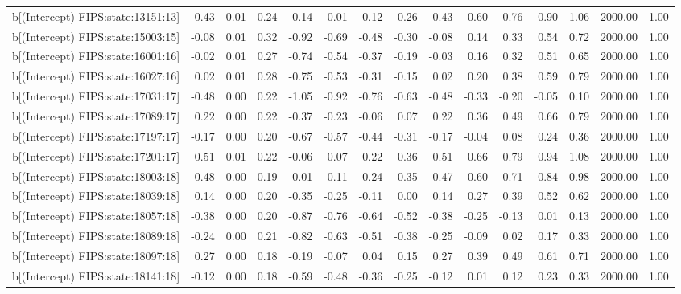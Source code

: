 \begin{table}[ht]
\begin{tabular}{rrrrrrrrrrrrrrr}
  b[(Intercept) FIPS:state:13151:13] & 0.43 & 0.01 & 0.24 & -0.14 & -0.01 & 0.12 & 0.26 & 0.43 & 0.60 & 0.76 & 0.90 & 1.06 & 2000.00 & 1.00 \\ 
  b[(Intercept) FIPS:state:15003:15] & -0.08 & 0.01 & 0.32 & -0.92 & -0.69 & -0.48 & -0.30 & -0.08 & 0.14 & 0.33 & 0.54 & 0.72 & 2000.00 & 1.00 \\ 
  b[(Intercept) FIPS:state:16001:16] & -0.02 & 0.01 & 0.27 & -0.74 & -0.54 & -0.37 & -0.19 & -0.03 & 0.16 & 0.32 & 0.51 & 0.65 & 2000.00 & 1.00 \\ 
  b[(Intercept) FIPS:state:16027:16] & 0.02 & 0.01 & 0.28 & -0.75 & -0.53 & -0.31 & -0.15 & 0.02 & 0.20 & 0.38 & 0.59 & 0.79 & 2000.00 & 1.00 \\ 
  b[(Intercept) FIPS:state:17031:17] & -0.48 & 0.00 & 0.22 & -1.05 & -0.92 & -0.76 & -0.63 & -0.48 & -0.33 & -0.20 & -0.05 & 0.10 & 2000.00 & 1.00 \\ 
  b[(Intercept) FIPS:state:17089:17] & 0.22 & 0.00 & 0.22 & -0.37 & -0.23 & -0.06 & 0.07 & 0.22 & 0.36 & 0.49 & 0.66 & 0.79 & 2000.00 & 1.00 \\ 
  b[(Intercept) FIPS:state:17197:17] & -0.17 & 0.00 & 0.20 & -0.67 & -0.57 & -0.44 & -0.31 & -0.17 & -0.04 & 0.08 & 0.24 & 0.36 & 2000.00 & 1.00 \\ 
  b[(Intercept) FIPS:state:17201:17] & 0.51 & 0.01 & 0.22 & -0.06 & 0.07 & 0.22 & 0.36 & 0.51 & 0.66 & 0.79 & 0.94 & 1.08 & 2000.00 & 1.00 \\ 
  b[(Intercept) FIPS:state:18003:18] & 0.48 & 0.00 & 0.19 & -0.01 & 0.11 & 0.24 & 0.35 & 0.47 & 0.60 & 0.71 & 0.84 & 0.98 & 2000.00 & 1.00 \\ 
  b[(Intercept) FIPS:state:18039:18] & 0.14 & 0.00 & 0.20 & -0.35 & -0.25 & -0.11 & 0.00 & 0.14 & 0.27 & 0.39 & 0.52 & 0.62 & 2000.00 & 1.00 \\ 
  b[(Intercept) FIPS:state:18057:18] & -0.38 & 0.00 & 0.20 & -0.87 & -0.76 & -0.64 & -0.52 & -0.38 & -0.25 & -0.13 & 0.01 & 0.13 & 2000.00 & 1.00 \\ 
  b[(Intercept) FIPS:state:18089:18] & -0.24 & 0.00 & 0.21 & -0.82 & -0.63 & -0.51 & -0.38 & -0.25 & -0.09 & 0.02 & 0.17 & 0.33 & 2000.00 & 1.00 \\ 
  b[(Intercept) FIPS:state:18097:18] & 0.27 & 0.00 & 0.18 & -0.19 & -0.07 & 0.04 & 0.15 & 0.27 & 0.39 & 0.49 & 0.61 & 0.71 & 2000.00 & 1.00 \\ 
  b[(Intercept) FIPS:state:18141:18] & -0.12 & 0.00 & 0.18 & -0.59 & -0.48 & -0.36 & -0.25 & -0.12 & 0.01 & 0.12 & 0.23 & 0.33 & 2000.00 & 1.00 \\ 

\end{tabular}
\end{table}
